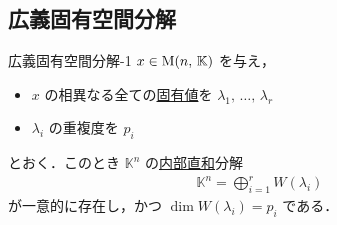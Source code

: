\documentclass[rep_main]{subfiles}
\begin{document}
\subsection{広義固有空間分解}

\begin{mytheo}[label=thm:eigen-decomp-1]{広義固有空間分解-1}
    $x \in \mathrm{M}(n,\, \mathbb{K})$ を与え，
    \begin{itemize}
        \item $x$ の相異なる全ての\hyperref[def:eigen]{固有値}を $\lambda_1,\, \dots,\, \lambda_r$
        \item $\lambda_i$ の重複度を $p_i$
    \end{itemize} 
    とおく．このとき $\mathbb{K}^n$ の\hyperref[prop:subvec-directsum]{内部直和}分解
    \begin{align}
        \mathbb{K}^n = \bigoplus_{i=1}^r W(\lambda_i)
    \end{align}
    が一意的に存在し，かつ $\dim W(\lambda_i) = p_i$ である．
\end{mytheo}
\end{document}
